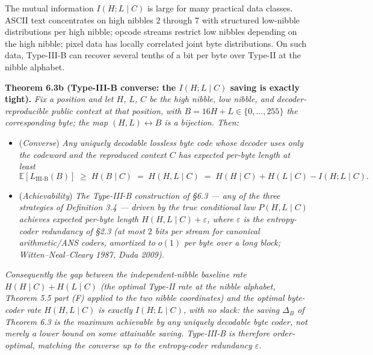 \documentclass[
]{article}
\begin{document}
The mutual information $I(H ; L \mid C)$ is large for many practical
data classes. ASCII text concentrates on high nibbles 2 through 7 with
structured low-nibble distributions per high nibble; opcode streams
restrict low nibbles depending on the high nibble; pixel data has
locally correlated joint byte distributions. On such data, Type-III-B
can recover several tenths of a bit per byte over Type-II at the
nibble alphabet.

\textbf{Theorem 6.3b (Type-III-B converse: the $I(H;L \mid C)$
saving is exactly tight).} \emph{Fix a position and let $H$, $L$, $C$
be the high nibble, low nibble, and decoder-reproducible public
context at that position, with $B = 16H + L \in \{0, \ldots, 255\}$
the corresponding byte; the map $(H, L) \leftrightarrow B$ is a
bijection. Then:}
\begin{itemize}
\item[\textbf{(C)}] (\emph{Converse}) \emph{Any uniquely decodable
lossless byte code whose decoder uses only the codeword and the
reproduced context $C$ has expected per-byte length at least}
\[
\mathbb{E}[L_{\mathrm{III\text{-}B}}(B)] \;\geq\; H(B \mid C) \;=\; H(H, L \mid C)
\;=\; H(H \mid C) + H(L \mid C) - I(H ; L \mid C).
\tag{6.2b}
\]
\item[\textbf{(A)}] (\emph{Achievability}) \emph{The Type-III-B
construction of §6.3 --- any of the three strategies of
Definition 3.4 --- driven by the true conditional law
$P(H, L \mid C)$ achieves expected per-byte length
$H(H, L \mid C) + \varepsilon$, where $\varepsilon$ is the
entropy-coder redundancy of §2.3 (at most $2$ bits per stream for
canonical arithmetic/ANS coders, amortized to $o(1)$ per byte over a
long block; Witten--Neal--Cleary 1987, Duda 2009).}
\end{itemize}
\emph{Consequently the gap between the independent-nibble baseline
rate $H(H \mid C) + H(L \mid C)$ (the optimal Type-II rate at the
nibble alphabet, Theorem 5.5 part (F) applied to the two nibble
coordinates) and the optimal byte-coder rate $H(H, L \mid C)$ is
exactly $I(H ; L \mid C)$, with no slack: the saving $\Delta_B$ of
Theorem 6.3 is the \emph{maximum} achievable by any uniquely
decodable byte coder, not merely a lower bound on some attainable
saving. Type-III-B is therefore order-optimal, matching the converse
up to the entropy-coder redundancy $\varepsilon$.}
\end{document}
